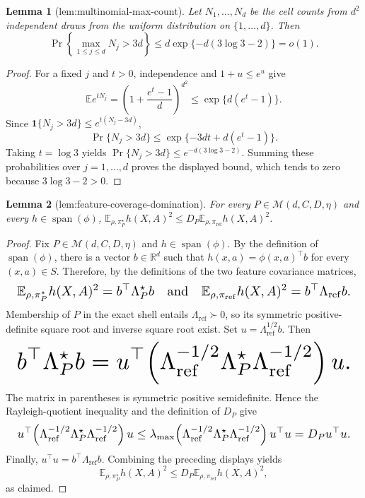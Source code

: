 \documentclass{article}
\newtheorem{lemma}{Lemma}
\begin{document}
\begin{lemma}[lem:multinomial-max-count]\label{lem:multinomial-max-count}
Let \(N_1,\ldots,N_d\) be the cell counts from \(d^2\) independent draws from the uniform distribution on \(\{1,\ldots,d\}\). Then
\[
\Pr\left\{\max_{1\le j\le d}N_j>3d\right\}
\le d\exp\{-d(3\log3-2)\}=o(1).
\]
\end{lemma}
\begin{proof}
For a fixed \(j\) and \(t>0\), independence and \(1+u\le e^u\) give
\[
\mathbb E e^{tN_j}
=\left(1+\frac{e^t-1}{d}\right)^{d^2}
\le\exp\{d(e^t-1)\}.
\]
Since \(\mathbf 1\{N_j>3d\}\le e^{t(N_j-3d)}\),
\[
\Pr\{N_j>3d\}
\le\exp\{-3dt+d(e^t-1)\}.
\]
Taking \(t=\log3\) yields \(\Pr\{N_j>3d\}\le e^{-d(3\log3-2)}\). Summing these probabilities over \(j=1,\ldots,d\) proves the displayed bound, which tends to zero because \(3\log3-2>0\).
\end{proof}

\begin{lemma}[lem:feature-coverage-domination]\label{lem:feature-coverage-domination}
For every \(P\in\mathcal M(d,C,D,\eta)\) and every \(h\in\operatorname{span}(\phi)\), \(\mathbb E_{\rho,\pi_P^\star}h(X,A)^2\le D_P\mathbb E_{\rho,\pi_{\mathrm{ref}}}h(X,A)^2\).
\end{lemma}
\begin{proof}
Fix \(P\in\mathcal M(d,C,D,\eta)\) and \(h\in\operatorname{span}(\phi)\). By the definition of \(\operatorname{span}(\phi)\), there is a vector \(b\in\mathbb R^d\) such that \(h(x,a)=\phi(x,a)^\top b\) for every \((x,a)\in S\). Therefore, by the definitions of the two feature covariance matrices,
\[
\makebox[\linewidth][c]{\resizebox{0.98\linewidth}{!}{\(\displaystyle \mathbb E_{\rho,\pi_P^\star}h(X,A)^2=b^\top\Lambda_P^\star b
\quad\text{and}\quad
\mathbb E_{\rho,\pi_{\mathrm{ref}}}h(X,A)^2=b^\top\Lambda_{\mathrm{ref}}b.\)}}
\]
Membership of \(P\) in the exact shell entails \(\Lambda_{\mathrm{ref}}\succ0\), so its symmetric positive-definite square root and inverse square root exist. Set \(u=\Lambda_{\mathrm{ref}}^{1/2}b\). Then
\[
\makebox[\linewidth][c]{\resizebox{0.98\linewidth}{!}{\(\displaystyle b^\top\Lambda_P^\star b
=u^\top\!\left(\Lambda_{\mathrm{ref}}^{-1/2}\Lambda_P^\star\Lambda_{\mathrm{ref}}^{-1/2}\right)u.\)}}
\]
The matrix in parentheses is symmetric positive semidefinite. Hence the Rayleigh-quotient inequality and the definition of \(D_P\) give
\[
\makebox[\linewidth][c]{\resizebox{0.98\linewidth}{!}{\(\displaystyle u^\top\!\left(\Lambda_{\mathrm{ref}}^{-1/2}\Lambda_P^\star\Lambda_{\mathrm{ref}}^{-1/2}\right)u
\le \lambda_{\max}\!\left(\Lambda_{\mathrm{ref}}^{-1/2}\Lambda_P^\star\Lambda_{\mathrm{ref}}^{-1/2}\right)u^\top u
=D_Pu^\top u.\)}}
\]
Finally, \(u^\top u=b^\top\Lambda_{\mathrm{ref}}b\). Combining the preceding displays yields
\[
\mathbb E_{\rho,\pi_P^\star}h(X,A)^2
\le D_P\mathbb E_{\rho,\pi_{\mathrm{ref}}}h(X,A)^2,
\]
as claimed.
\end{proof}
\end{document}
